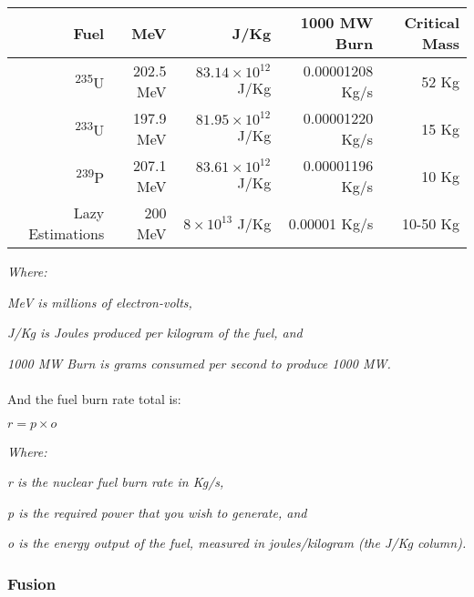 \vspace{1\baselineskip}
\begin{tabular}{| r | r | r | r | r |}

\hline

Fuel & MeV & J/Kg & 1000 MW Burn & Critical Mass \\

\hline

\textsuperscript{235}U & 202.5 MeV & $83.14 \times 10^{12}$ J/Kg & 0.00001208 Kg/s & 52 Kg \\

\textsuperscript{233}U & 197.9 MeV & $81.95 \times 10^{12}$ J/Kg & 0.00001220 Kg/s & 15 Kg \\

\textsuperscript{239}P & 207.1 MeV & $83.61 \times 10^{12}$ J/Kg & 0.00001196 Kg/s & 10 Kg \\

Lazy Estimations & 200 MeV & $8 \times 10^{13}$ J/Kg & 0.00001 Kg/s & 10-50 Kg \\

\hline

\end{tabular}
\vspace{1\baselineskip}

\par
\textit{Where:}
\par
\textit{MeV is millions of electron-volts,}
\par
\textit{J/Kg is Joules produced per kilogram of the fuel, and}
\par
\textit{1000 MW Burn is grams consumed per second to produce 1000 MW.}

\paragraph{}
And the fuel burn rate total is:

$r = p \times o$

\par
\textit{Where:}
\par
\textit{r is the nuclear fuel burn rate in Kg/s,}
\par
\textit{p is the required power that you wish to generate, and}
\par
\textit{o is the energy output of the fuel, measured in joules/kilogram (the J/Kg column).}

\subsubsection{Fusion}

